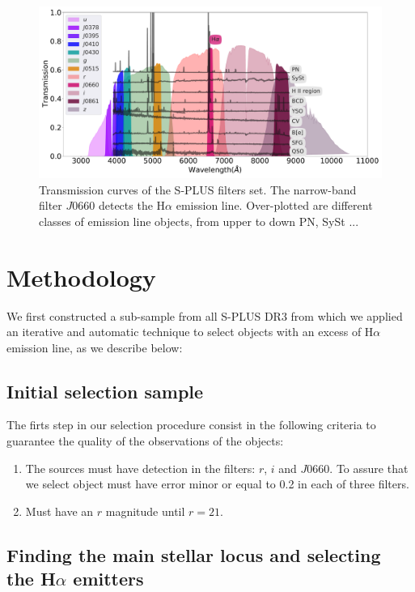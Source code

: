 \documentclass[fleqn,usenatbib]{mnras}
\begin{document}
\begin{figure}
    \includegraphics[width=0.9\linewidth]{Figs/splus-filter.pdf}
    \caption{Transmission curves of the S-PLUS filters set. The narrow-band filter
      $J0660$ detects the H$\alpha$ emission line. Over-plotted are different
      classes of emission line objects, from upper to down PN, SySt ... }
    \label{fig:curves}
\end{figure}


\section{Methodology}
\label{sec:metho}

We first constructed a sub-sample from all S-PLUS DR3 from which we
applied an iterative and automatic technique to select objects with
an excess of H{$\alpha$} emission line, as we describe below:

\subsection{Initial selection sample}
\label{sec:}

The firts step in our selection procedure consist in the following
criteria to guarantee the quality of the observations of the objects:

\begin{enumerate}
\item The sources must have detection in the filters: $r$, $i$ and
  $J$0660. To assure that we select object must have error minor or
  equal to 0.2 in each of three filters.

\item Must have an $r$ magnitude until $r = 21$.
  
\end{enumerate}

\subsection{Finding the main stellar locus and selecting the H{$\alpha$ emitters} }
\label{sec:}
\end{document}
